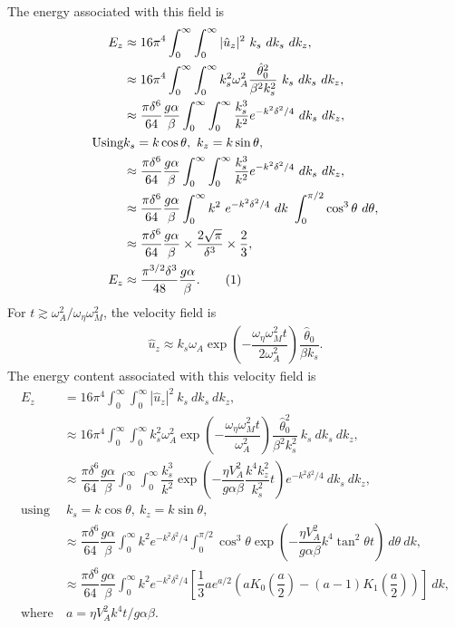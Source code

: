 \documentclass[12pt,psfig]{article}
\newcommand\numberthis{\addtocounter{equation}{1}\tag{\theequation}}
\begin{document}
The energy associated with this field is
\begin{align*}
E_z&\approx 16\pi^4\int_{0}^{\infty}\int_{0}^{\infty}|\hat{u}_z|^2 \ k_s \ dk_s \ dk_z, \\
&\approx 16\pi^4\int_{0}^{\infty}\int_{0}^{\infty}k_s^2 \omega_A^2 \dfrac{\hat{\theta}_0^2}{\beta^2 k_s^2} \ k_s \ dk_s \ dk_z, \\
&\approx \dfrac{\pi\delta^6}{64 }\dfrac{g\alpha}{\beta}\int_{0}^{\infty}\int_{0}^{\infty}\dfrac{ k_s^3}{k^2}e^{-k^2\delta^2/4} \ dk_s \ dk_z, \\
\text{Using}& k_s=k\cos\theta, \ k_z=k\sin\theta,\\
&\approx \dfrac{\pi\delta^6}{64 }\dfrac{g\alpha}{\beta}\int_{0}^{\infty}\int_{0}^{\infty}\dfrac{ k_s^3}{k^2}e^{-k^2\delta^2/4} \ dk_s \ dk_z, \\
&\approx \dfrac{\pi\delta^6}{64 }\dfrac{g\alpha}{\beta}\int_{0}^{\infty}k^2\ e^{-k^2\delta^2/4} \ dk \ \int_{0}^{\pi/2}\cos^3\theta  \ d\theta, \\
&\approx \dfrac{\pi\delta^6}{64 }\dfrac{g\alpha}{\beta}\times \dfrac{2\sqrt{\pi}}{\delta^3} \times \dfrac{2}{3}, \\
E_z&\approx \dfrac{\pi^{3/2}\delta^3}{48 }\dfrac{g\alpha}{\beta}. \numberthis \label{Ezconst}
\end{align*}
For $t\gtrsim \omega_A^2/\omega_\eta \omega_M^2$, the velocity field is
\begin{align*}
\hat{u}_z\approx k_s\omega_A  \exp\left(-\dfrac{\omega_\eta\omega_M^2t}{2\omega_A^2}\right) \dfrac{\hat{\theta}_0}{\beta k_s}.
\end{align*}
The energy content associated with this velocity field is
\begin{align*}
E_z&=16\pi^4\int_{0}^{\infty}\int_{0}^{\infty}|\hat{u}_z|^2 \ k_s \ dk_s \ dk_z,\\
&\approx 16\pi^4\int_{0}^{\infty}\int_{0}^{\infty}k_s^2\omega_A^2\exp\left(-\dfrac{\omega_\eta\omega_M^2t}{\omega_A^2}\right) \dfrac{\hat{\theta}_0^2}{\beta^2k_s^2}\ k_s \ dk_s \ dk_z,\\
&\approx \dfrac{\pi\delta^6}{64}\dfrac{g\alpha}{\beta}\int_{0}^{\infty}\int_{0}^{\infty}\dfrac{k_s^3}{k^2}\exp\left(-\dfrac{\eta V_A^2}{g\alpha\beta}\dfrac{k^4k_z^2}{k_s^2}t\right) e^{-k^2\delta^2/4} \ dk_s \ dk_z,\\
\text{using}& \ k_s=k \cos\theta, \ k_z=k\sin\theta,\\
&\approx \dfrac{\pi\delta^6}{64}\dfrac{g\alpha}{\beta}\int_{0}^{\infty}k^2 e^{-k^2\delta^2/4} \int_{0}^{\pi/2}\cos^3\theta\exp\left(-\dfrac{\eta V_A^2}{g\alpha\beta}k^4\tan^2\theta t\right)  \ d\theta \ dk,\\
&\approx \dfrac{\pi\delta^6}{64}\dfrac{g\alpha}{\beta}\int_{0}^{\infty}k^2 e^{-k^2\delta^2/4} \left[\dfrac{1}{3} a e^{a/2} \left(a K_0\left(\dfrac{a}{2}\right)-(a-1) K_1\left(\dfrac{a}{2}\right)\right)\right] \ dk,\\
\text{where}& \ a=\eta V_A^2k^4 t/g\alpha\beta.
\end{align*}
\end{document}
